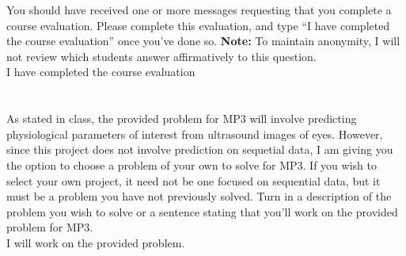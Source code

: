 \documentclass{article}[12pt]
\begin{document}
You should have received one or more messages requesting that you complete a course evaluation. Please complete this evaluation, and type ``I have completed the course evaluation'' once you've done so. \textbf{Note:} To maintain anonymity, I will not review which students answer affirmatively to this question. \\

I have completed the course evaluation

\section{}

As stated in class, the provided problem for MP3 will involve predicting physiological parameters of interest from ultrasound images of eyes. However, since this project does not involve prediction on sequetial data, I am giving you the option to choose a problem of your own to solve for MP3. If you wish to select your own project, it need not be one focused on sequential data, but it must be a problem you have not previously solved. Turn in a description of the problem you wish to solve
or a sentence stating that you'll work on the provided problem for MP3. \\

I will work on the provided problem.
\end{document}
